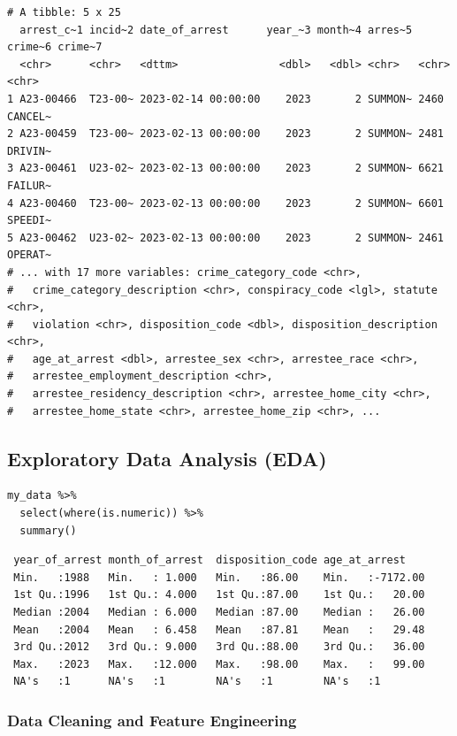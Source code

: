\documentclass[
  article]{jss}
\begin{document}
\begin{verbatim}
# A tibble: 5 x 25
  arrest_c~1 incid~2 date_of_arrest      year_~3 month~4 arres~5 crime~6 crime~7
  <chr>      <chr>   <dttm>                <dbl>   <dbl> <chr>   <chr>   <chr>  
1 A23-00466  T23-00~ 2023-02-14 00:00:00    2023       2 SUMMON~ 2460    CANCEL~
2 A23-00459  T23-00~ 2023-02-13 00:00:00    2023       2 SUMMON~ 2481    DRIVIN~
3 A23-00461  U23-02~ 2023-02-13 00:00:00    2023       2 SUMMON~ 6621    FAILUR~
4 A23-00460  T23-00~ 2023-02-13 00:00:00    2023       2 SUMMON~ 6601    SPEEDI~
5 A23-00462  U23-02~ 2023-02-13 00:00:00    2023       2 SUMMON~ 2461    OPERAT~
# ... with 17 more variables: crime_category_code <chr>,
#   crime_category_description <chr>, conspiracy_code <lgl>, statute <chr>,
#   violation <chr>, disposition_code <dbl>, disposition_description <chr>,
#   age_at_arrest <dbl>, arrestee_sex <chr>, arrestee_race <chr>,
#   arrestee_employment_description <chr>,
#   arrestee_residency_description <chr>, arrestee_home_city <chr>,
#   arrestee_home_state <chr>, arrestee_home_zip <chr>, ...
\end{verbatim}

\hypertarget{exploratory-data-analysis-eda}{%
\subsection{Exploratory Data Analysis
(EDA)}\label{exploratory-data-analysis-eda}}

\begin{verbatim}
my_data %>%
  select(where(is.numeric)) %>% 
  summary()
\end{verbatim}

\begin{verbatim}
 year_of_arrest month_of_arrest  disposition_code age_at_arrest     
 Min.   :1988   Min.   : 1.000   Min.   :86.00    Min.   :-7172.00  
 1st Qu.:1996   1st Qu.: 4.000   1st Qu.:87.00    1st Qu.:   20.00  
 Median :2004   Median : 6.000   Median :87.00    Median :   26.00  
 Mean   :2004   Mean   : 6.458   Mean   :87.81    Mean   :   29.48  
 3rd Qu.:2012   3rd Qu.: 9.000   3rd Qu.:88.00    3rd Qu.:   36.00  
 Max.   :2023   Max.   :12.000   Max.   :98.00    Max.   :   99.00  
 NA's   :1      NA's   :1        NA's   :1        NA's   :1         
\end{verbatim}

\hypertarget{data-cleaning-and-feature-engineering}{%
\subsubsection{Data Cleaning and Feature
Engineering}\label{data-cleaning-and-feature-engineering}}
\end{document}
